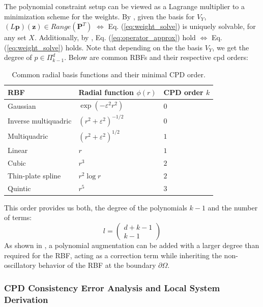 \documentclass[11pt]{article}
\begin{document}
The polynomial constraint setup can be viewed as a Lagrange multiplier to a minimization scheme for the weights. By \cite{Davydov2020}, given the basis for $V_Y$, $(L\bm{p})(\bm{z}) \in Range(\bm{P}^T)$ $\iff$ Eq. (\ref{eq:weight_solve}) is uniquely solvable, for any set $X$. Additionally, by \cite{Davydov2020}, Eq. (\ref{eq:operator_approx}) hold $\iff$ Eq. (\ref{eq:weight_solve}) holds. Note that depending on the the basis $V_Y$, we get the degree of $p \in \Pi_{k-1}^d$. Below are common RBFs and their respective cpd orders:
\begin{table}[ht]
    \centering
    \caption{Common radial basis functions and their minimal CPD order.}
    \label{tab:rbf-cpd-order}
    \begin{tabular}{lll}
        \hline
        \textbf{RBF} & \textbf{Radial function $\phi(r)$} & 
        \textbf{CPD order $k$} \\
        \hline
        Gaussian & $\exp(-\varepsilon^2 r^2)$ & $0$ \\[2pt]
        Inverse multiquadric & 
        $(r^2+\varepsilon^2)^{-1/2}$ & $0$ \\[2pt]
        Multiquadric & 
        $(r^2+\varepsilon^2)^{1/2}$ & $1$ \\[2pt]
        Linear & $r$ & $1$ \\[2pt]
        Cubic & $r^3$ & $2$ \\[2pt]
        Thin-plate spline & $r^2\log r$ & $2$ \\[2pt]
        Quintic & $r^5$ & $3$ \\[2pt]
        \hline
    \end{tabular}
\end{table}
This order provides us both, the degree of the polynomials $k-1$ and the number of terms:
\begin{equation*}
l=\begin{pmatrix}
	d+k-1 \\ k-1
\end{pmatrix}
\end{equation*}
As shown in \cite{Bayona2019}, a polynomial augmentation can be added with a larger degree than required for the RBF, acting as a correction term while inheriting the non-oscillatory behavior of the RBF at the boundary $\partial \Omega$.

\subsubsection{CPD Consistency Error Analysis and Local System Derivation}
\end{document}
